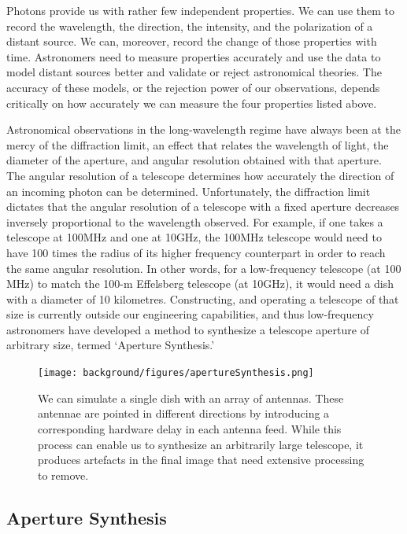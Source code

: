 Photons provide us with rather few independent properties. We can use them to record the wavelength, the direction, the intensity, and the polarization of a distant source. We can, moreover, record the change of those properties with time. Astronomers need to measure properties accurately and use the data to model distant sources better and validate or reject astronomical theories. The accuracy of these models, or the rejection power of our observations, depends critically on how accurately we can measure the four properties listed above. 

Astronomical observations in the long-wavelength regime have always been at the mercy of the diffraction limit, an effect that relates the wavelength of light, the diameter of the aperture, and angular resolution obtained with that aperture. The angular resolution of a telescope determines how accurately the direction of an incoming photon can be determined. Unfortunately, the diffraction limit dictates that the angular resolution of a telescope with a fixed aperture decreases inversely proportional to the wavelength observed. For example, if one takes a telescope at 100MHz and one at 10GHz, the 100MHz telescope would need to have 100 times the radius of its higher frequency counterpart in order to reach the same angular resolution. In other words, for a low-frequency telescope (at 100 MHz) to match the 100-m Effelsberg telescope (at 10GHz), it would need a dish with a diameter of 10 kilometres. Constructing, and operating a telescope of that size is currently outside our engineering capabilities, and thus low-frequency astronomers have developed a method to synthesize a telescope aperture of arbitrary size, termed `Aperture Synthesis.' 

\begin{figure}[h]
    \centering
    \texttt{[image: background/figures/apertureSynthesis.png]}
    \caption[Graphical representation of aperture synthesis]{We can simulate a single dish with an array of antennas. These antennae are pointed in different directions by introducing a corresponding hardware delay in each antenna feed. While this process can enable us to synthesize an arbitrarily large telescope, it produces artefacts in the final image that need extensive processing to remove. }
    \label{fig:aperture_synthesis}
\end{figure}


\subsection{Aperture Synthesis}

